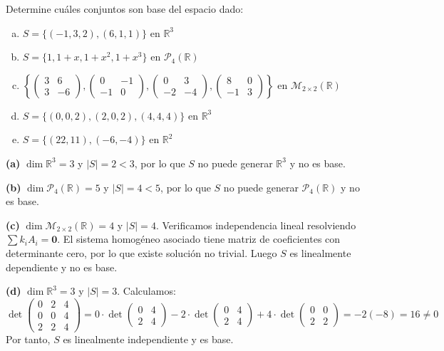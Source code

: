 \begin{prob} Determine cuáles conjuntos son base del espacio dado:
\begin{enumerate}[(a)]
\item $S=\{(-1,3,2), (6,1,1)\}$ en $\mathbb{R}^3$
\item $S=\{1, 1+x, 1+x^2, 1+x^3\}$ en $\mathcal{P}_4(\mathbb{R})$
\item $\left\{\begin{pmatrix}3&6\\3&-6\end{pmatrix}, \begin{pmatrix}0&-1\\-1&0\end{pmatrix}, \begin{pmatrix}0&3\\-2&-4\end{pmatrix}, \begin{pmatrix}8&0\\-1&3\end{pmatrix}\right\}$ en $\mathcal{M}_{2\times2}(\mathbb{R})$
\item $S=\{(0,0,2), (2,0,2), (4,4,4)\}$ en $\mathbb{R}^3$
\item $S=\{(22,11), (-6,-4)\}$ en $\mathbb{R}^2$
\end{enumerate}

\begin{myproof}
\textbf{(a)} $\dim \mathbb{R}^3 = 3$ y $|S|=2 < 3$, por lo que $S$ no puede generar $\mathbb{R}^3$ y no es base.

\textbf{(b)} $\dim \mathcal{P}_4(\mathbb{R}) = 5$ y $|S|=4 < 5$, por lo que $S$ no puede generar $\mathcal{P}_4(\mathbb{R})$ y no es base.

\textbf{(c)} $\dim \mathcal{M}_{2\times2}(\mathbb{R}) = 4$ y $|S|=4$. Verificamos independencia lineal resolviendo $\sum k_i A_i = \mathbf{0}$. El sistema homogéneo asociado tiene matriz de coeficientes con determinante cero, por lo que existe solución no trivial. Luego $S$ es linealmente dependiente y no es base.

\textbf{(d)} $\dim \mathbb{R}^3 = 3$ y $|S|=3$. Calculamos: 
$$\det \begin{pmatrix}0&2&4\\0&0&4\\2&2&4\end{pmatrix} = 0 \cdot \det\begin{pmatrix}0&4\\2&4\end{pmatrix} - 2 \cdot \det\begin{pmatrix}0&4\\2&4\end{pmatrix} + 4 \cdot \det\begin{pmatrix}0&0\\2&2\end{pmatrix} = -2(-8) = 16 \neq 0$$
Por tanto, $S$ es linealmente independiente y es base.


\end{myproof}
\end{prob}
